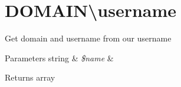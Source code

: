 \section{D\+O\+M\+A\+I\+N\textbackslash{}username}
Get domain and username from our username


\begin{DoxyParams}[1]{Parameters}
string & {\em \$name} & \\
\hline
\end{DoxyParams}
\begin{DoxyReturn}{Returns}
array
\end{DoxyReturn}

\begin{DoxyCodeInclude}
\end{DoxyCodeInclude}
 